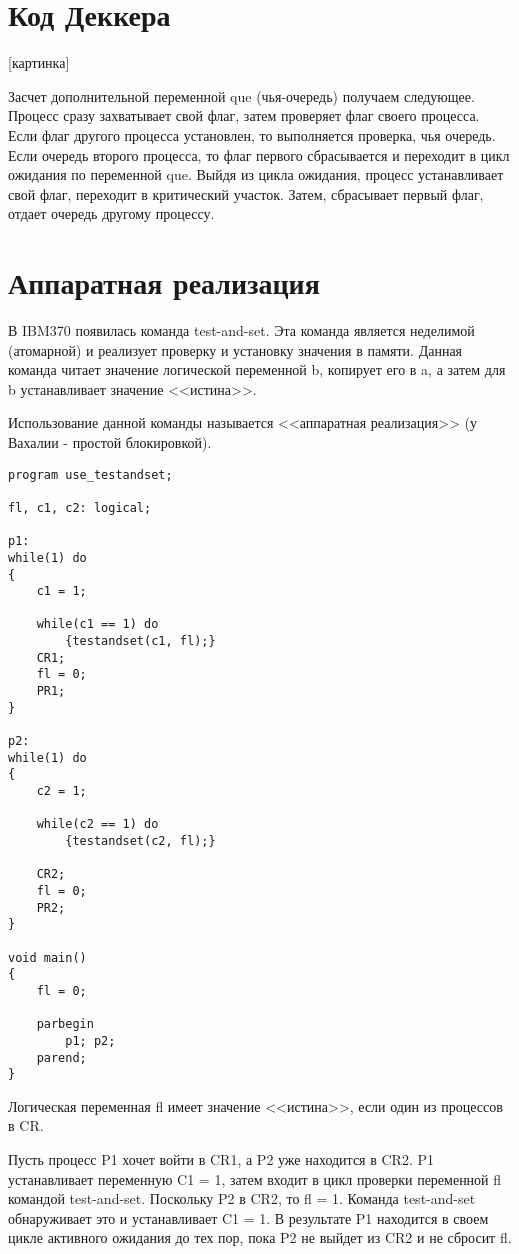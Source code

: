 \documentclass[a4paper, 14pt]{report}
\begin{document}
	\section*{Код Деккера}
	
	[картинка]
	
	Засчет дополнительной переменной que (чья-очередь) получаем следующее. Процесс сразу захватывает свой флаг, затем проверяет флаг своего процесса. Если флаг другого процесса установлен, то выполняется проверка, чья очередь. Если очередь второго процесса, то флаг первого сбрасывается и переходит в цикл ожидания по переменной que. Выйдя из цикла ожидания, процесс устанавливает свой флаг, переходит в критический участок. Затем, сбрасывает первый флаг, отдает очередь другому процессу.
	
	\section*{Аппаратная реализация}
	
	В IBM370 появилась команда test-and-set. Эта команда является неделимой (атомарной) и реализует проверку и установку значения в памяти. Данная команда читает значение логической переменной b, копирует его в a, а затем для b устанавливает значение <<истина>>.
	
	Использование данной команды называется <<аппаратная реализация>> (у Вахалии - простой блокировкой).
	
	\begin{lstlisting}
program use_testandset;

fl, c1, c2: logical;

p1:
while(1) do
{
	c1 = 1;
	
	while(c1 == 1) do
		{testandset(c1, fl);}
	CR1;
	fl = 0;
	PR1;
}

p2:
while(1) do
{
	c2 = 1;
	
	while(c2 == 1) do
		{testandset(c2, fl);}
	
	CR2;
	fl = 0;
	PR2;
}

void main()
{
	fl = 0;
	
	parbegin
		p1; p2;
	parend;
}
	\end{lstlisting}

	Логическая переменная fl имеет значение <<истина>>, если один из процессов в CR.
	
	Пусть процесс P1 хочет войти в CR1, а P2 уже находится в CR2. P1 устанавливает переменную C1 = 1, затем входит в цикл проверки переменной fl командой test-and-set. Поскольку P2 в CR2, то fl = 1. Команда test-and-set обнаруживает это и устанавливает C1 = 1. В результате P1 находится в своем цикле активного ожидания до тех пор, пока P2 не выйдет из CR2 и не сбросит fl.
	
\end{document}
